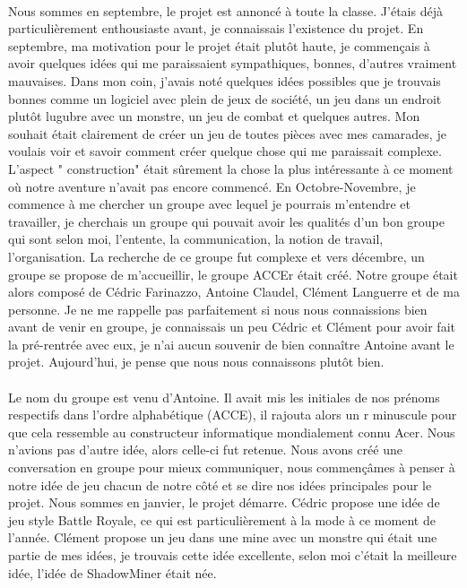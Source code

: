 \documentclass[titlepage, 13px, a4paper]{report}
\begin{document}
\paragraph*{} \hspace{0pt}
Nous sommes en septembre, le projet est annoncé à toute la classe. 
J’étais déjà particulièrement enthousiaste avant, je connaissais l’existence du projet. 
En septembre, ma motivation pour le projet était plutôt haute, je commençais à avoir quelques idées 
qui me paraissaient sympathiques, bonnes, d’autres vraiment mauvaises. Dans mon coin, 
j’avais noté quelques idées possibles que je trouvais bonnes comme un logiciel avec plein de jeux de société, 
un jeu dans un endroit plutôt lugubre avec un monstre, un jeu de combat et quelques autres. 
Mon souhait était clairement de créer un jeu de toutes pièces avec mes camarades, 
je voulais voir et savoir comment créer quelque chose qui me paraissait complexe. 
L’aspect " construction"  était sûrement la chose la plus intéressante à ce moment où notre aventure 
n’avait pas encore commencé. En Octobre-Novembre, je commence à me chercher un groupe avec lequel je pourrais 
m’entendre et travailler, je cherchais un groupe qui pouvait avoir les qualités d’un bon groupe 
qui sont selon moi, l’entente, la communication, la notion de travail, l’organisation. 
La recherche de ce groupe fut complexe et vers décembre, un groupe se propose de m’accueillir, 
le groupe ACCEr était créé. Notre groupe était alors composé de Cédric Farinazzo, Antoine Claudel, 
Clément Languerre et de ma personne. Je ne me rappelle pas parfaitement si nous nous connaissions 
bien avant de venir en groupe, je connaissais un peu Cédric et Clément pour avoir fait 
la pré-rentrée avec eux, je n’ai aucun souvenir de bien connaître Antoine avant le projet. 
Aujourd’hui, je pense que nous nous connaissons plutôt bien. \\


\paragraph*{} \hspace{0pt}
Le nom du groupe est venu d'Antoine. Il avait mis les initiales de nos 
prénoms respectifs dans l’ordre alphabétique (ACCE), il rajouta alors un r minuscule pour 
que cela ressemble au constructeur informatique mondialement connu Acer. Nous n’avions pas 
d’autre idée, alors celle-ci fut retenue. Nous avons créé une conversation en groupe pour 
mieux communiquer, nous commençâmes à penser à notre idée de jeu chacun de notre côté et 
se dire nos idées principales pour le projet. Nous sommes en janvier, le projet démarre. 
Cédric propose une idée de jeu style Battle Royale, ce qui est particulièrement à la mode 
à ce moment de l’année. Clément propose un jeu dans une mine avec un monstre qui était une 
partie de mes idées, je trouvais cette idée excellente, selon moi c’était la meilleure idée, 
l’idée de ShadowMiner était née. \\
\end{document}
